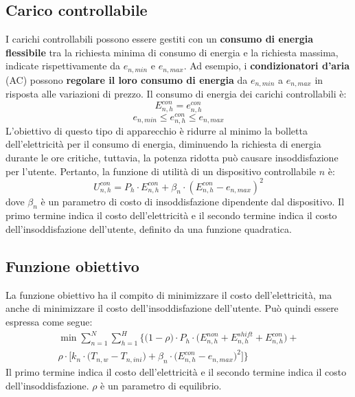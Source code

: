 \documentclass[italian, Lau, oneside]{sapthesis}
\begin{document}
\subsection{Carico controllabile}
I carichi controllabili possono essere gestiti con un \textbf{consumo di energia flessibile} tra la richiesta minima di consumo di energia e la richiesta massima, indicate rispettivamente da $e_{n,min}$ e $e_{n,max}$. Ad esempio, i \textbf{condizionatori d'aria} (AC) possono \textbf{regolare il loro consumo di energia} da $e_{n,min}$ a $e_{n,max}$ in risposta alle variazioni di prezzo. Il consumo di energia dei carichi controllabili è:
\begin{equation}
    E^{con}_{n,h} = e^{con}_{n,h}
\end{equation}
\begin{equation}
    e_{n,min} \leq e^{con}_{n,h} \leq e_{n,max}
\end{equation}
L'obiettivo di questo tipo di apparecchio è ridurre al minimo la bolletta dell'elettricità per il consumo di energia, diminuendo la richiesta di energia durante le ore critiche, tuttavia, la potenza ridotta può causare insoddisfazione per l'utente. Pertanto, la funzione di utilità di un dispositivo controllabile $n$ è:
\begin{equation}
    U^{con}_{n,h} = P_h \cdot E^{con}_{n,h} + \beta_n \cdot (E^{con}_{n,h} - e_{n,max})^2
\end{equation}
dove $\beta_n$ è un parametro di costo di insoddisfazione dipendente dal dispositivo. Il primo termine indica il costo dell'elettricità e il secondo termine indica il costo dell'insoddisfazione dell'utente, definito da una funzione quadratica.

\subsection{Funzione obiettivo}
La funzione obiettivo ha il compito di minimizzare il costo dell'elettricità, ma anche di minimizzare il costo dell'insoddisfazione dell'utente. Può quindi essere espressa come segue:
\begin{equation}
    \begin{split}
    \min \sum^{N}_{n=1} \sum^{H}_{h=1} \Bigg\{ \Big(1-\rho\Big) \cdot P_h \cdot \Big( E^{non}_{n,h} + E^{shift}_{n,h} + E^{con}_{n,h} \Big) + \\ \rho \cdot \bigg[ k_n \cdot \Big(T_{n,w} - T_{n,ini}\Big) + \beta_n \cdot \Big(E^{con}_{n,h} - e_{n,max}\Big)^2\bigg] \Bigg\}
    \end{split}
\end{equation}
Il primo termine indica il costo dell'elettricità e il secondo termine indica il costo dell'insoddisfazione. $\rho$ è un parametro di equilibrio.
\end{document}

